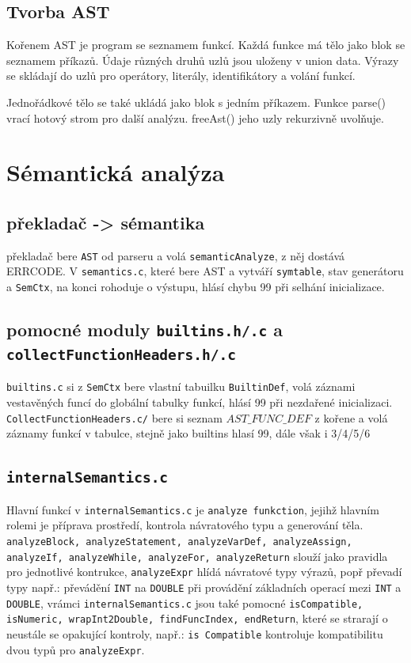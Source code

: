 \documentclass{article}
\begin{document}
\subsection{Tvorba AST}

Kořenem AST je program se seznamem funkcí. Každá funkce má tělo jako blok se seznamem příkazů. Údaje různých druhů uzlů jsou uloženy v union data. Výrazy se skládají do uzlů pro operátory, literály, identifikátory a volání funkcí.

Jednořádkové tělo se také ukládá jako blok s jedním příkazem. Funkce parse() vrací hotový strom pro další analýzu. freeAst() jeho uzly rekurzivně uvolňuje.

\newpage
\section{Sémantická analýza}
\subsection{překladač -> sémantika}
překladač bere \texttt{AST} od parseru a volá \texttt{semanticAnalyze}, z něj dostává ERRCODE. V \texttt{semantics.c}, které bere AST a vytváří \texttt{symtable}, stav generátoru a \texttt{SemCtx}, na konci rohoduje o výstupu, hlásí chybu 99 při selhání inicializace.
\subsection{pomocné moduly \texttt{builtins.h/.c} a \texttt{collectFunctionHeaders.h/.c}}
\texttt{builtins.c} si z \texttt{SemCtx} bere vlastní tabuilku \texttt{BuiltinDef}, volá záznami vestavěných funcí do globální tabulky funkcí, hlásí 99 při nezdařené inicializaci. \texttt{CollectFunctionHeaders.c/} bere si seznam \texttt{$AST\_FUNC\_DEF$} z kořene a volá záznamy funkcí v tabulce, stejně jako builtins hlasí 99, dále však i 3/4/5/6
\subsection{\texttt{internalSemantics.c}}
Hlavní funkcí v \texttt{internalSemantics.c} je \texttt{analyze funkction}, jejihž hlavním rolemi je příprava prostředí, kontrola návratového typu a generování těla. \texttt{analyzeBlock, analyzeStatement, analyzeVarDef, analyzeAssign, analyzeIf, analyzeWhile, analyzeFor, analyzeReturn} slouží jako pravidla pro jednotlivé kontrukce, \texttt{analyzeExpr} hlídá návratové typy výrazů, popř převadí typy např.: převádění \texttt{INT} na \texttt{DOUBLE} při provádění základních operací mezi \texttt{INT} a \texttt{DOUBLE}, vrámci \texttt{internalSemantics.c} jsou také pomocné \texttt{isCompatible, isNumeric, wrapInt2Double, findFuncIndex, endReturn}, které se strarají o neustále se opakující kontroly, např.: \texttt{is Compatible} kontroluje kompatibilitu dvou typů pro \texttt{analyzeExpr}.
\newpage
\end{document}
